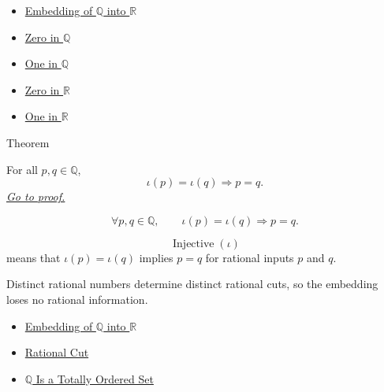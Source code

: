 \begin{dependencies}
\begin{itemize}
  \item \hyperref[def:real-chapter-embedding-q-into-r]{Embedding of $\mathbb{Q}$ into $\mathbb{R}$}
  \item \hyperref[def:zero-in-q]{Zero in $\mathbb{Q}$}
  \item \hyperref[def:one-in-q]{One in $\mathbb{Q}$}
  \item \hyperref[def:zero-in-r]{Zero in $\mathbb{R}$}
  \item \hyperref[def:one-in-r]{One in $\mathbb{R}$}
\end{itemize}
\end{dependencies}

\begin{theorembox}{Theorem}
\begin{theorem}
\label{thm:embedding-q-into-r-injective}
For all $p,q\in\mathbb{Q}$,
\[
\iota(p)=\iota(q) \Longrightarrow p=q.
\]
\hyperref[prf:embedding-q-into-r-injective]{\textit{Go to proof.}}
\end{theorem}
\end{theorembox}

\begin{remark*}
\[
\forall p,q\in\mathbb{Q},\qquad
\iota(p)=\iota(q)\Longrightarrow p=q.
\]
\end{remark*}

\begin{remark*}
\[
\operatorname{Injective}(\iota)
\]
means that $\iota(p)=\iota(q)$ implies $p=q$ for rational inputs $p$ and $q$.
\end{remark*}

\begin{remark*}[Interpretation]
Distinct rational numbers determine distinct rational cuts, so the embedding loses no rational information.
\end{remark*}

\begin{dependencies}
\begin{itemize}
  \item \hyperref[def:real-chapter-embedding-q-into-r]{Embedding of $\mathbb{Q}$ into $\mathbb{R}$}
  \item \hyperref[def:rational-cut]{Rational Cut}
  \item \hyperref[thm:q-totally-ordered-set]{$\mathbb{Q}$ Is a Totally Ordered Set}
\end{itemize}
\end{dependencies}

